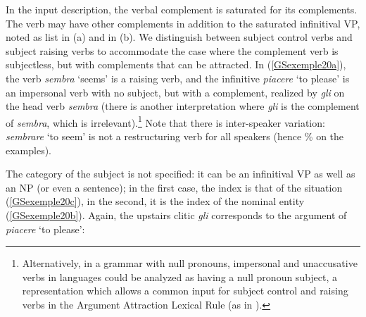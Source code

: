 \noindent
In the input description, the verbal complement is saturated for its complements. The verb may have other complements in addition to the saturated infinitival VP, noted as list  in (a) and  in (b). We distinguish between subject control verbs and subject raising verbs to accommodate the case where the complement verb is subjectless, but with complements that can be attracted. In (\ref{GSexemple20a}), the verb \emph{sembra} `seems' is a raising verb, and the infinitive \emph{piacere} `to please' is an impersonal verb with no subject, but with a complement, realized by \emph{gli} on the head verb \emph{sembra} (there is another interpretation where \emph{gli} is the complement of \emph{sembra}, which is irrelevant).\footnote{Alternatively, in a grammar with null pronouns, impersonal and unaccusative verbs in  languages could be analyzed as having a null pronoun subject, a representation which allows a common input for subject control and raising verbs in the Argument Attraction Lexical Rule (as in \citealt[331]{Monachesi98a}).} Note that there is inter-speaker variation: \emph{sembrare} `to seem' is not a restructuring verb for all  speakers (hence \% on the examples).

The category of the subject is not specified: it can be an infinitival VP as well as an NP (or even a sentence); in the first case, the index is that of the situation (\ref{GSexemple20c}), in the second, it is the index of the nominal entity (\ref{GSexemple20b}). Again, the upstairs clitic \emph{gli} corresponds to the argument of \emph{piacere} `to please':

\eal
\judgewidth{\%}
	\label{GSexemple20}
    \label{GSexemple20a}

	\label{GSexemple20b}		
		
	\label{GSexemple20c}	
\zl

